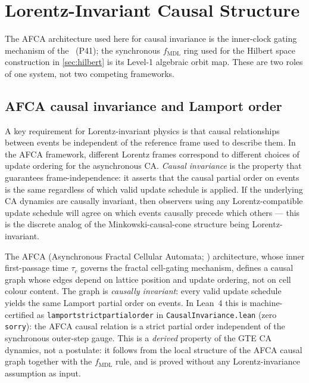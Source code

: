 \documentclass[11pt]{article}
\theoremstyle{remark}
\newcommand{\MDL}{\text{MDL}}
\newcommand{\lean}[1]{%
  \penalty-100
  \begingroup\def\_{\textunderscore\allowbreak}\texttt{#1}\endgroup}
\newcommand{\CMCA}{\text{CMCA}}
\begin{document}
\section{Lorentz-Invariant Causal Structure}
\label{sec:lorentz_causal}

The AFCA architecture used here for causal invariance is the inner-clock gating
mechanism of the \CMCA\ (P41); the synchronous $f_{\MDL}$ ring used for the
Hilbert space construction in \cref{sec:hilbert} is its Level-1 algebraic orbit
map. These are two roles of one system, not two competing frameworks.

\subsection{AFCA causal invariance and Lamport order}
\label{ssec:causal_invariance}

A key requirement for Lorentz-invariant physics is that causal relationships
between events be independent of the reference frame used to describe them.
In the AFCA framework, different Lorentz frames correspond to different choices
of update ordering for the asynchronous CA.
\emph{Causal invariance} is the property that guarantees frame-independence: it
asserts that the causal partial order on events is the same regardless of which
valid update schedule is applied.
If the underlying CA dynamics are causally invariant, then observers using any
Lorentz-compatible update schedule will agree on which events causally precede
which others --- this is the discrete analog of the Minkowski-causal-cone
structure being Lorentz-invariant.

The AFCA (Asynchronous Fractal Cellular Automata;
\cite{SpivackEmergentGravity}) architecture, whose inner first-passage
time $\tau_c$ governs the fractal cell-gating mechanism, defines a
causal graph whose edges depend on lattice position and update ordering,
not on cell colour content.
The graph is \emph{causally invariant}: every valid update schedule yields
the same Lamport partial order on events.
In Lean~4 this is machine-certified as
\lean{lamport\_strict\_partial\_order} in
\texttt{CausalInvariance.lean} (zero \texttt{sorry}): the AFCA causal
relation is a strict partial order independent of the synchronous
outer-step gauge.
This is a \emph{derived} property of the GTE CA dynamics, not a postulate:
it follows from the local structure of the AFCA causal graph together with
the $f_{\MDL}$ rule, and is proved without any Lorentz-invariance assumption
as input.
\end{document}
